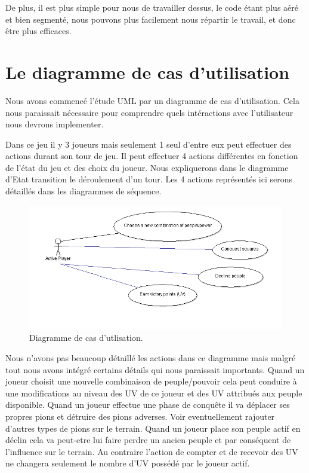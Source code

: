 \documentclass[11pt]{report}
\begin{document}
			De plus, il est plus simple pour nous de travailler dessus, le code étant plus aéré et bien segmenté, nous pouvons plus facilement nous répartir le travail, et donc être plus efficaces. 

	\section{Le diagramme de cas d'utilisation}
	
	Nous avons commencé l'étude UML par un diagramme de cas d'utilisation.
Cela nous paraissait nécessaire pour comprendre quels intéractions avec l'utilisateur nous devrons implementer. 

Dans ce jeu il y 3 joueurs mais seulement 1 seul d'entre eux peut effectuer des actions durant son tour de jeu.
Il peut effectuer 4 actions différentes en fonction de l'état du jeu et des choix du joueur.
Nous expliquerons dans le diagramme d'Etat transition le déroulement d'un tour. 
Les 4 actions représentés ici serons détaillés dans les diagrammes de séquence.

\begin{figure}[!h]
\centering
\includegraphics[width=13cm]{CasDutilisationPrincipal.png}
\caption{Diagramme de cas d'utlisation.}
\end{figure}

Nous n'avons pas beaucoup détaillé les actions dans ce diagramme mais malgré tout nous avons intégré certains détails qui nous paraissait importants.
Quand un joueur choisit une nouvelle combinaison de peuple/pouvoir cela peut conduire à une modifications au niveau des UV de ce joueur et des UV attribués aux peuple disponible.
Quand un joueur effectue une phase de conquête il va déplacer ses propres pions et détruire des pions adverses. Voir eventuellement rajouter d'autres types de pions sur le terrain.
Quand un joueur place son peuple actif en déclin cela va peut-etre lui faire perdre un ancien peuple et par conséquent de l'influence sur le terrain.
Au contraire l'action de compter et de recevoir des UV ne changera seulement le nombre d'UV possédé par le joueur actif.
\end{document}
